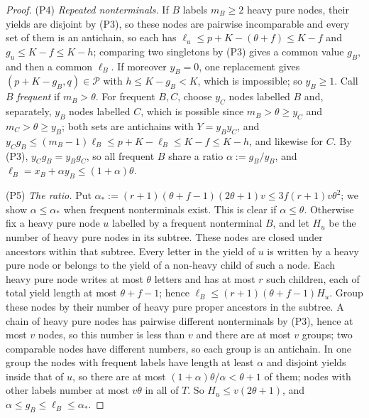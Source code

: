 \begin{proof}
(P4) \emph{Repeated nonterminals.}  If $B$ labels $m_B\ge2$ heavy pure nodes,
their yields are disjoint by (P3), so these nodes are pairwise incomparable and
every set of them is an antichain, so each has $\ell_u\le p+K-(\theta+f)\le K-f$ and
$g_u\le K-f\le K-h$; comparing two singletons by (P3) gives a common value $g_B$,
and then a common $\ell_B$.  If moreover $y_B=0$, one replacement gives
$(p+K-g_B,q)\in\mathcal P$ with $h\le K-g_B<K$, which is impossible; so $y_B\ge1$.
Call $B$ \emph{frequent} if $m_B>\theta$.  For frequent $B,C$, choose $y_C$ nodes
labelled $B$ and, separately, $y_B$ nodes labelled $C$, which is possible since
$m_B>\theta\ge y_C$ and $m_C>\theta\ge y_B$; both sets are antichains with
$Y=y_By_C$, and $y_Cg_B\le(m_B-1)\ell_B\le p+K-\ell_B\le K-f\le K-h$, and likewise
for $C$.  By (P3), $y_Cg_B=y_Bg_C$, so all frequent $B$ share a ratio
$\alpha:=g_B/y_B$, and $\ell_B=x_B+\alpha y_B\le(1+\alpha)\theta$.

(P5) \emph{The ratio.}  Put $\alpha_*:=(r+1)(\theta+f-1)(2\theta+1)v\le3f(r+1)v\theta^2$;
we show $\alpha\le\alpha_*$ when frequent nonterminals exist.  This is clear if
$\alpha\le\theta$.  Otherwise fix a heavy pure node $u$ labelled by a frequent
nonterminal $B$, and let $H_u$ be the number of heavy pure nodes in its subtree.
These nodes are closed under ancestors within that subtree.  Every letter in the
yield of $u$ is written by a heavy pure node or belongs to the yield of a
non-heavy child of such a node.  Each heavy pure node writes at most $\theta$
letters and has at most $r$ such children, each of total yield length at most
$\theta+f-1$; hence $\ell_B\le(r+1)(\theta+f-1)H_u$.  Group these nodes by their
number of heavy pure proper ancestors in the subtree.  A chain of heavy pure
nodes has pairwise different nonterminals by (P3), hence at most $v$ nodes, so
this number is less than $v$ and there are at most $v$ groups; two comparable
nodes have different numbers, so each group is an antichain.  In one group the nodes with frequent labels have
length at least $\alpha$ and disjoint yields inside that of $u$, so there are at
most $(1+\alpha)\theta/\alpha<\theta+1$ of them; nodes with other labels number at
most $v\theta$ in all of $T$.  So $H_u\le v(2\theta+1)$, and
$\alpha\le g_B\le\ell_B\le\alpha_*$.


\end{proof}
